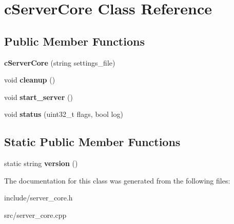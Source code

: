 \hypertarget{classcServerCore}{\section{c\-Server\-Core \-Class \-Reference}
\label{d7/d07/classcServerCore}
}
\subsection*{\-Public \-Member \-Functions}
\begin{DoxyCompactItemize}
\item 
\hypertarget{classcServerCore_accc35f76d7064522fb8483465a34d117}{{\bfseries c\-Server\-Core} (string settings\-\_\-file)}\label{d7/d07/classcServerCore_accc35f76d7064522fb8483465a34d117}

\item 
\hypertarget{classcServerCore_ae6d720ebdc88a47cd82ef9701e1f24e3}{void {\bfseries cleanup} ()}\label{d7/d07/classcServerCore_ae6d720ebdc88a47cd82ef9701e1f24e3}

\item 
\hypertarget{classcServerCore_a7c38faeb17d1bf9705c65082ef7d9e35}{void {\bfseries start\-\_\-server} ()}\label{d7/d07/classcServerCore_a7c38faeb17d1bf9705c65082ef7d9e35}

\item 
\hypertarget{classcServerCore_ad2d7490392221f486c05dfcdade9a5a5}{void {\bfseries status} (uint32\-\_\-t flags, bool log)}\label{d7/d07/classcServerCore_ad2d7490392221f486c05dfcdade9a5a5}

\end{DoxyCompactItemize}
\subsection*{\-Static \-Public \-Member \-Functions}
\begin{DoxyCompactItemize}
\item 
\hypertarget{classcServerCore_a9cc302f6c83a40f646b78d3b9f03c31c}{static string {\bfseries version} ()}\label{d7/d07/classcServerCore_a9cc302f6c83a40f646b78d3b9f03c31c}

\end{DoxyCompactItemize}


\-The documentation for this class was generated from the following files\-:\begin{DoxyCompactItemize}
\item 
include/server\-\_\-core.\-h\item 
src/server\-\_\-core.\-cpp\end{DoxyCompactItemize}
